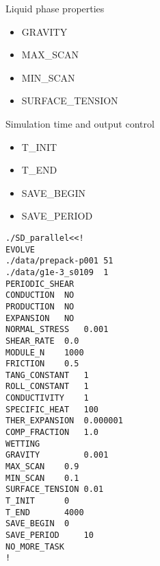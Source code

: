 \documentclass[11pt, a4paper]{report}
\begin{document}
Liquid phase properties
\begin{itemize}\itemsep -2pt
 \item GRAVITY
 \item MAX\_SCAN
 \item MIN\_SCAN
 \item SURFACE\_TENSION
\end{itemize}

Simulation time and output control
\begin{itemize}\itemsep -2pt
 \item T\_INIT
 \item T\_END
 \item SAVE\_BEGIN
 \item SAVE\_PERIOD 
\end{itemize}

\begin{lstlisting}[caption="Typical script for input parameters."]
./SD_parallel<<!
EVOLVE 
./data/prepack-p001	51	
./data/g1e-3_s0109  1
PERIODIC_SHEAR
CONDUCTION	NO
PRODUCTION	NO
EXPANSION	NO
NORMAL_STRESS 	0.001
SHEAR_RATE	0.0
MODULE_N 	1000
FRICTION 	0.5
TANG_CONSTANT 	1
ROLL_CONSTANT 	1
CONDUCTIVITY	1
SPECIFIC_HEAT	100
THER_EXPANSION  0.000001
COMP_FRACTION	1.0
WETTING
GRAVITY         0.001
MAX_SCAN	0.9
MIN_SCAN	0.1
SURFACE_TENSION 0.01
T_INIT		0
T_END		4000
SAVE_BEGIN	0
SAVE_PERIOD     10	
NO_MORE_TASK
!
\end{lstlisting}

%

\end{document}
